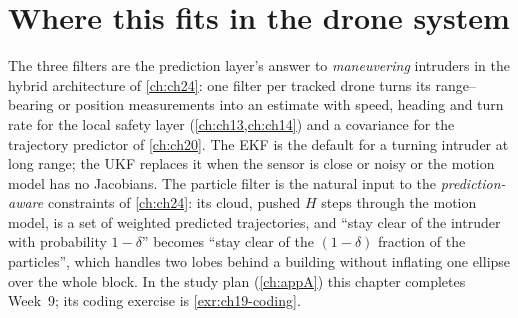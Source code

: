 \section[Where this fits]{Where this fits in the drone system}
\label{sec:ch19-drone}

\begin{dronebox}
The three filters are the prediction layer's answer to \emph{maneuvering}
intruders in the hybrid architecture of \cref{ch:ch24}: one filter per
tracked drone turns its range--bearing or position measurements into an
estimate with speed, heading and turn rate for the local safety layer
(\cref{ch:ch13,ch:ch14}) and a covariance for the trajectory predictor of
\cref{ch:ch20}. The EKF is the default for a turning intruder at long
range; the UKF replaces it when the sensor is close or noisy or the motion
model has no Jacobians. The particle filter is the natural
input to the \emph{prediction-aware} constraints of \cref{ch:ch24}: its
cloud, pushed $H$ steps through the motion model, is a set of weighted
predicted trajectories, and ``stay clear of the intruder with probability
$1 - \delta$'' becomes ``stay clear of the $(1 - \delta)$ fraction of the
particles'', which handles two lobes behind a building without inflating
one ellipse over the whole block. In the study plan (\cref{ch:appA}) this
chapter completes Week~9; its coding exercise is \cref{exr:ch19-coding}.
\end{dronebox}

